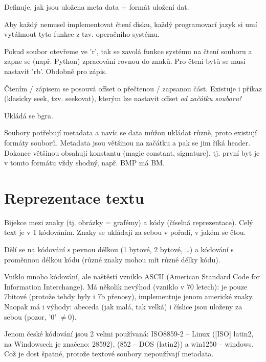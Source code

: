 \documentclass[12pt]{article}					%
\begin{document}
    \begin{definice}
        Definuje, jak jsou uložena meta data + formát uložení dat.

        Aby každý nemusel implementovat čtení disku, každý programovací jazyk si umí vytáhnout tyto funkce z tzv. operačního systému.
    \end{definice}

    \begin{definice}
        Pokud soubor otevřeme ve 'r', tak se zavolá funkce systému na čtení souboru a zapne se (např. Python) zpracování rovnou do znaků. Pro čtení bytů se musí nastavit 'rb'. Obdobně pro zápis.

        Čtením / zápisem se posouvá offset o přečtenou / zapsanou část. Existuje i příkaz (klasicky seek, tzv. seekovat), kterým lze nastavit offset \emph{od začátku souboru!}
    \end{definice}

    \begin{definice}[Obrázky]
        Ukládá se bgra.
    \end{definice}

    \begin{definice}
        Soubory potřebují metadata a navíc se data můžou ukládat různě, proto existují formáty souborů. Metadata jsou většinou na začátku a pak se jim říká header. Dokonce většinou obsahují konstantu (magic constant, signature), tj. první byt je v tomto formátu vždy shodný, např. BMP má BM.
    \end{definice}

\section{Reprezentace textu}
    \begin{definice}[Kódování]
        Bijekce mezi znaky (tj. obrázky = grafémy) a kódy (číselná reprezentace). Celý text je v 1 kódováním. Znaky se ukládají za sebou v pořadí, v jakém se čtou.

        Dělí se na kódování s pevnou délkou (1 bytové, 2 bytové, …) a kódování s proměnnou délkou kódu (různé znaky mohou mít různé délky kódu).

        Vniklo mnoho kódování, ale naštěstí vzniklo ASCII (American Standard Code for Information Interchange). Má několik nevýhod (vzniklo v 70 letech): je pouze 7bitové (protože tehdy byly i 7b přenosy), implementuje jenom americké znaky. Naopak má i výhody: abeceda (jak malá, tak velká) i číslice jsou uloženy za sebou (pozor, '0' $≠ 0$).

        Jenom české kódování jsou 2 velmi používaná: ISO8859-2 -- Linux ([ISO] latin2, na Windowsech je značeno: 28592), (852 -- DOS (latin2)) a win1250 -- windows. Což je dost špatné, protože textové soubory nepoužívají metadata.
    \end{definice}
\end{document}
